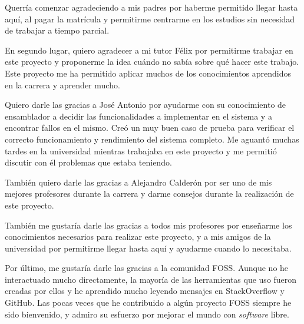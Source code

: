 \documentclass[es]{uc3mthesisIEEE}
\begin{document}
  \begin{acknowledgements}
    Querría comenzar agradeciendo a mis padres por haberme permitido llegar
    hasta aquí, al pagar la matrícula y permitirme centrarme en los estudios sin
    necesidad de trabajar a tiempo parcial.

    En segundo lugar, quiero agradecer a mi tutor Félix por permitirme trabajar
    en este proyecto y proponerme la idea cuándo no sabía sobre qué hacer este
    trabajo. Este proyecto me ha permitido aplicar muchos de los conocimientos
    aprendidos en la carrera y aprender mucho.

    Quiero darle las gracias a José Antonio por ayudarme con su conocimiento de
    ensamblador a decidir las funcionalidades a implementar en el sistema y a
    encontrar fallos en el mismo. Creó un muy buen caso de prueba para verificar
    el correcto funcionamiento y rendimiento del sistema completo. Me aguantó
    muchas tardes en la universidad mientras trabajaba en este proyecto y me
    permitió discutir con él problemas que estaba teniendo.

    También quiero darle las gracias a Alejandro Calderón por ser uno de mis
    mejores profesores durante la carrera y darme consejos durante la
    realización de este proyecto.

    También me gustaría darle las gracias a todos mis profesores por enseñarme
    los conocimientos necesarios para realizar este proyecto, y a mis amigos de
    la universidad por permitirme llegar hasta aquí y ayudarme cuando lo
    necesitaba.

    Por último, me gustaría darle las gracias a la comunidad FOSS. Aunque no he
    interactuado mucho directamente, la mayoría de las herramientas que uso
    fueron creadas por ellos y he aprendido mucho leyendo mensajes en
    StackOverflow y GitHub. Las pocas veces que he contribuido a algún proyecto
    FOSS siempre he sido bienvenido, y admiro su esfuerzo por mejorar el mundo
    con \textit{software} libre.
  \end{acknowledgements}


  \tableofcontents
  \listoffigures
  \listoftables


  \begin{thesis}
  \end{thesis}
\end{document}
